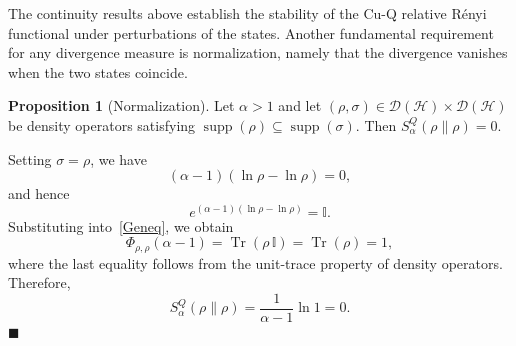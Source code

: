\documentclass[a4paper, amsfonts, amssymb, amsmath, reprint, showkeys, nofootinbib, twoside, aps, pra]{revtex4-2}
\theoremstyle{definition}
\newtheorem{proposition}[theorem]{Proposition}
\renewenvironment{proof}{\noindent{\bfseries Proof.}}{\hfill$\blacksquare$}
\begin{document}
The continuity results above establish the stability of the Cu-Q relative Rényi functional under perturbations of the states. Another fundamental requirement for any divergence measure is normalization, namely that the divergence vanishes when the two states
coincide.
    
\begin{proposition}[Normalization]\label{Prop:Normalization}
Let $\alpha > 1$ and let $(\rho,\sigma)\in\mathcal{D}(\mathcal{H})
\times\mathcal{D}(\mathcal{H})$ be density operators satisfying 
$\operatorname{supp}(\rho)\subseteq\operatorname{supp}(\sigma)$. 
Then $S^Q_\alpha(\rho\|\rho) = 0$.
\end{proposition}

\begin{proof}
Setting $\sigma = \rho$, we have
\begin{equation}
    (\alpha-1)(\ln\rho-\ln\rho) = 0,
\end{equation}
and hence
\begin{equation}
    e^{(\alpha-1)(\ln\rho-\ln\rho)} = \mathbb{I}.
\end{equation}
Substituting into~\eqref{Geneq}, we obtain
\begin{equation}
    \Phi_{\rho,\rho}(\alpha-1) =\operatorname{Tr}\!\left(\rho\,\mathbb{I}\right)
    =\operatorname{Tr}(\rho)=1,
\end{equation}
where the last equality follows from the unit-trace property of density operators.
Therefore,
\begin{equation}
    S^Q_\alpha(\rho\|\rho) = \frac{1}{\alpha-1}\ln 1 = 0.
\end{equation}
\end{proof}
\end{document}
